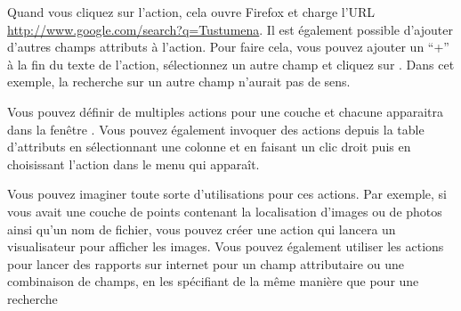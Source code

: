 Quand vous cliquez sur l'action, cela ouvre Firefox et charge l'URL \url{http://www.google.com/search?q=Tustumena}. Il est également possible d'ajouter d'autres champs attributs à l'action. Pour faire cela, vous pouvez ajouter un ``+'' à la fin du texte de l'action, sélectionnez un autre champ et cliquez sur . Dans cet exemple, la recherche sur un autre champ n'aurait pas de sens.

Vous pouvez définir de multiples actions pour une couche et chacune apparaitra dans la fenêtre . Vous pouvez également invoquer des actions depuis la table d'attributs en sélectionnant une colonne et en faisant un clic droit puis en choisissant l'action dans le menu qui apparaît.

Vous pouvez imaginer toute sorte d'utilisations pour ces actions. Par exemple, si vous avait une couche de points contenant la localisation d'images ou de photos ainsi qu'un nom de fichier, vous pouvez créer une action qui lancera un visualisateur pour afficher les images. Vous pouvez également utiliser les actions pour lancer des rapports sur internet pour un champ attributaire ou une combinaison de champs, en les spécifiant de la même manière que pour une recherche

